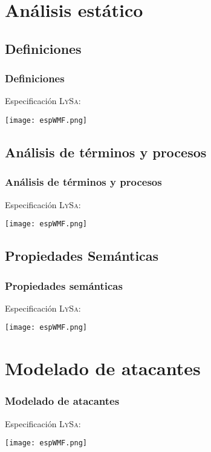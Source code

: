 \documentclass{beamer}
\begin{document}
\section{Análisis estático}

\subsection{Definiciones}

\begin{frame}
    \frametitle{Definiciones}
    \pause
    Especificación L\textsc{y}S\textsc{a}:
    \pause[2]
    \begin{center}
        \texttt{[image: espWMF.png]}
    \end{center}
\end{frame}

\subsection{Análisis de términos y procesos}

\begin{frame}
    \frametitle{Análisis de términos y procesos}
    \pause
    Especificación L\textsc{y}S\textsc{a}:
    \pause[2]
    \begin{center}
        \texttt{[image: espWMF.png]}
    \end{center}
\end{frame}

\subsection{Propiedades Semánticas}
\begin{frame}
    \frametitle{Propiedades semánticas}
    \pause
    Especificación L\textsc{y}S\textsc{a}:
    \pause[2]
    \begin{center}
        \texttt{[image: espWMF.png]}
    \end{center}
\end{frame}

\section{Modelado de atacantes}

\begin{frame}
    \frametitle{Modelado de atacantes}
    \pause
    Especificación L\textsc{y}S\textsc{a}:
    \pause[2]
    \begin{center}
        \texttt{[image: espWMF.png]}
    \end{center}
\end{frame}
\end{document}
